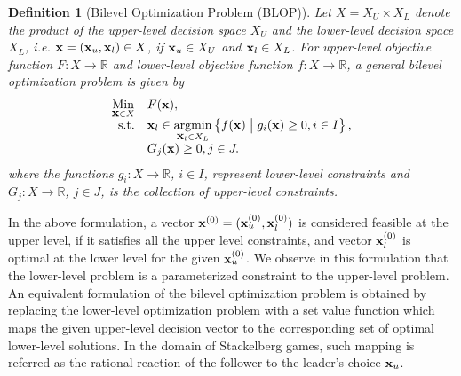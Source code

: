 \documentclass[twoside]{article}
\def\reals{\mathbb{R}}
\def\argmin{\mathop{\rm argmin}\limits}
\newtheorem{definition}[theorem]{Definition}
\begin{document}
\vskip 0.1cm
\begin{definition}[Bilevel Optimization Problem (BLOP)]
Let $X=X_U\times X_L$ denote the product of the upper-level decision space  $X_U$ and the lower-level decision space $X_L$, i.e. $\mbox{$\mathbf{x}$}=(\mbox{$\mathbf{x}$}_u,\mbox{$\mathbf{x}$}_l)\in X$, if $\mbox{$\mathbf{x}$}_u\in X_U$ and $\mbox{$\mathbf{x}$}_l\in X_L$. For upper-level objective function $F:X\to \reals$ and lower-level objective function $f:X\to \reals$, a general bilevel optimization problem is given by
\begin{equation}
\begin{array}{rl}
\underset{{\boldx\in X}}{\mbox{Min}} & F(\boldx), \\
\mbox{s.t.} & 
\boldx_l \in \underset{\boldx_l\in X_L}{\argmin}\left\lbrace 
 f(\boldx) \hspace{1mm}\big|\hspace{1mm} g_i(\boldx) \geq 0, i\in I \right\rbrace, \\
& G_j(\boldx)\geq 0, j\in J. 
\end{array} 
\label{eq:bilevel_multi_obj1}
\end{equation}
where the functions $g_i:X\to\reals$, $i\in I$, represent lower-level constraints and $G_j:X\to\reals$, $j\in J$, is the collection of upper-level constraints.
\end{definition}
\vskip 0.2cm

In the above formulation, a vector $\mbox{$\mathbf{x}$}^{(0)}=(\mbox{$\mathbf{x}$}_{u}^{(0)},\mbox{$\mathbf{x}$}_{l}^{(0)})$ is considered feasible at the upper level, if it satisfies all the upper level constraints, and vector $\mbox{$\mathbf{x}$}_{l}^{(0)}$ is optimal at the lower level for the given $\mbox{$\mathbf{x}$}_{u}^{(0)}$.
We observe in this formulation that the lower-level problem is a parameterized constraint to the upper-level problem. An equivalent formulation of the bilevel optimization problem is obtained by replacing the lower-level optimization problem with a set value function which maps the given upper-level decision vector to the corresponding set of optimal lower-level solutions. In the domain of Stackelberg games, such mapping is referred as the rational reaction of the follower to the leader's choice $\mbox{$\mathbf{x}$}_u$.
\end{document}
